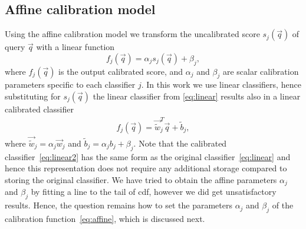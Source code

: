   \subsection{Affine calibration model}
   Using the affine calibration model we transform the uncalibrated score $s_j(\vec{q})$ of query $\vec{q}$ with a linear function 
     \begin{equation}
       f_j(\vec{q}) = \alpha_j s_j(\vec{q}) + \beta_j,
       \label{eq:affine}
     \end{equation}
	where 
	$ f_j(\vec{q})$ is the output calibrated score, and
	$\alpha_j$ and $\beta_j$ are scalar calibration parameters specific to each classifier $j$.
	In this work we use linear classifiers, hence substituting for $s_j(\vec{q})$ %
	the linear classifier from \eqref{eq:linear} results also in a linear calibrated classifier
    \begin{align}
    \label{eq:linear2}
        f_j(\vec{q}) = \vec{\widetilde{w}}_j^T \vec{q} + \widetilde{b}_j,
     \end{align}
  where $\vec{\widetilde{w}}_j = \alpha_j\vec{w}_j$ and $\widetilde{b}_j=\alpha_j b_j+\beta_j$. 
  Note that the calibrated classifier~\eqref{eq:linear2} has the same form as the original classifier~\eqref{eq:linear} and hence this representation does not require any additional storage compared to storing the original classifier. %
  \textcolor{petr}{We have tried to obtain the affine parameters $\alpha_j$ and $\beta_j$ by fitting a line to the tail of cdf, however we did get unsatisfactory results.}
  Hence, the question remains how to set the parameters $\alpha_j$ and $\beta_j$ of the calibration function~\eqref{eq:affine}, which is discussed next.


